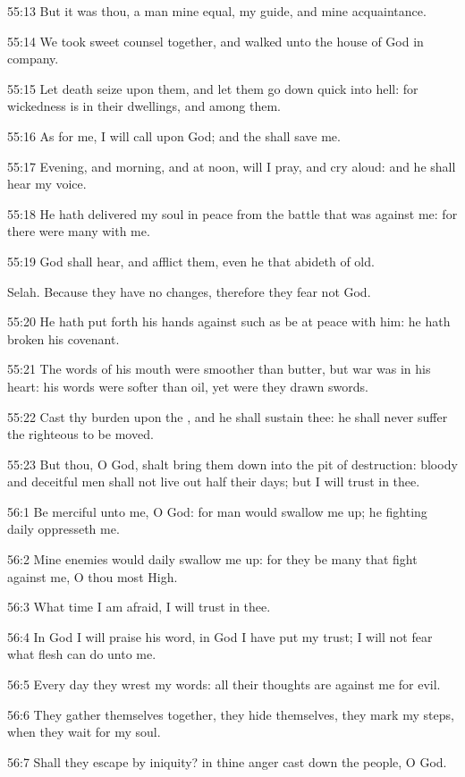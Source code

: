 55:13 But it was thou, a man mine equal, my guide, and mine
acquaintance.

55:14 We took sweet counsel together, and walked unto the house of God
in company.

55:15 Let death seize upon them, and let them go down quick into hell:
for wickedness is in their dwellings, and among them.

55:16 As for me, I will call upon God; and the \LORD shall save me.

55:17 Evening, and morning, and at noon, will I pray, and cry aloud:
and he shall hear my voice.

55:18 He hath delivered my soul in peace from the battle that was
against me: for there were many with me.

55:19 God shall hear, and afflict them, even he that abideth of old.

Selah. Because they have no changes, therefore they fear not God.

55:20 He hath put forth his hands against such as be at peace with
him: he hath broken his covenant.

55:21 The words of his mouth were smoother than butter, but war was in
his heart: his words were softer than oil, yet were they drawn swords.

55:22 Cast thy burden upon the \LORD, and he shall sustain thee: he
shall never suffer the righteous to be moved.

55:23 But thou, O God, shalt bring them down into the pit of
destruction: bloody and deceitful men shall not live out half their
days; but I will trust in thee.



56:1 Be merciful unto me, O God: for man would swallow me up; he
fighting daily oppresseth me.

56:2 Mine enemies would daily swallow me up: for they be many that
fight against me, O thou most High.

56:3 What time I am afraid, I will trust in thee.

56:4 In God I will praise his word, in God I have put my trust; I will
not fear what flesh can do unto me.

56:5 Every day they wrest my words: all their thoughts are against me
for evil.

56:6 They gather themselves together, they hide themselves, they mark
my steps, when they wait for my soul.

56:7 Shall they escape by iniquity? in thine anger cast down the
people, O God.

